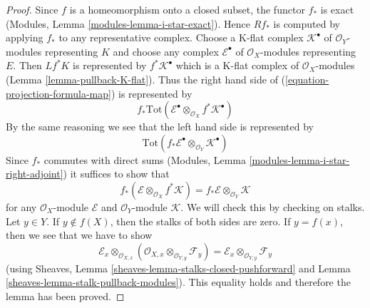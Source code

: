 \begin{proof}
Since $f$ is a homeomorphism onto a closed subset, the functor $f_*$
is exact (Modules, Lemma \ref{modules-lemma-i-star-exact}). Hence
$Rf_*$ is computed by applying $f_*$ to any representative complex.
Choose a K-flat complex $\mathcal{K}^\bullet$ of $\mathcal{O}_Y$-modules
representing $K$ and choose any complex $\mathcal{E}^\bullet$
of $\mathcal{O}_X$-modules representing $E$. Then
$Lf^*K$ is represented by $f^*\mathcal{K}^\bullet$ which is
a K-flat complex of $\mathcal{O}_X$-modules
(Lemma \ref{lemma-pullback-K-flat}). Thus the right hand side of
(\ref{equation-projection-formula-map}) is represented by
$$
f_*\text{Tot}(\mathcal{E}^\bullet
\otimes_{\mathcal{O}_X} f^*\mathcal{K}^\bullet)
$$
By the same reasoning we see that the left hand side is represented by
$$
\text{Tot}(f_*\mathcal{E}^\bullet \otimes_{\mathcal{O}_Y} \mathcal{K}^\bullet)
$$
Since $f_*$ commutes with direct sums
(Modules, Lemma \ref{modules-lemma-i-star-right-adjoint})
it suffices to show that
$$
f_*(\mathcal{E} \otimes_{\mathcal{O}_X} f^*\mathcal{K}) =
f_*\mathcal{E} \otimes_{\mathcal{O}_Y} \mathcal{K}
$$
for any $\mathcal{O}_X$-module $\mathcal{E}$ and $\mathcal{O}_Y$-module
$\mathcal{K}$. We will check this by checking on stalks.
Let $y \in Y$. If $y \not \in f(X)$, then the stalks
of both sides are zero. If $y = f(x)$, then we see that we have to show
$$
\mathcal{E}_x \otimes_{\mathcal{O}_{X, x}}
(\mathcal{O}_{X, x} \otimes_{\mathcal{O}_{Y, y}} \mathcal{F}_y) =
\mathcal{E}_x \otimes_{\mathcal{O}_{Y, y}} \mathcal{F}_y
$$
(using Sheaves, Lemma \ref{sheaves-lemma-stalks-closed-pushforward}
and Lemma \ref{sheaves-lemma-stalk-pullback-modules}).
This equality holds and therefore the lemma has been proved.
\end{proof}










